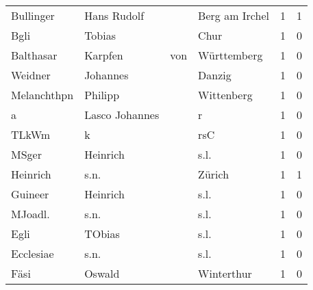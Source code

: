 \begin{center}
\begin{tiny}
\begin{longtabu}{llllrr}
                Bullinger &                        Hans Rudolf &             &                              Berg am Irchel &          1 &         1 \\
                     Bgli &                             Tobias &             &                                        Chur &          1 &         0 \\
                Balthasar &                            Karpfen &         von &                                 Württemberg &          1 &         0 \\
                  Weidner &                           Johannes &             &                                      Danzig &          1 &         0 \\
              Melanchthpn &                            Philipp &             &                                  Wittenberg &          1 &         0 \\
                        a &                     Lasco Johannes &             &                                           r &          1 &         0 \\
                    TLkWm &                                  k &             &                                         rsC &          1 &         0 \\
                    MSger &                           Heinrich &             &                                        s.l. &          1 &         0 \\
                 Heinrich &                               s.n. &             &                                      Zürich &          1 &         1 \\
                  Guineer &                           Heinrich &             &                                        s.l. &          1 &         0 \\
                  MJoadl. &                               s.n. &             &                                        s.l. &          1 &         0 \\
                     Egli &                             TObias &             &                                        s.l. &          1 &         0 \\
                Ecclesiae &                               s.n. &             &                                        s.l. &          1 &         0 \\
                     Fäsi &                             Oswald &             &                                  Winterthur &          1 &         0 \\

\end{longtabu}
\end{tiny}
\end{center}
